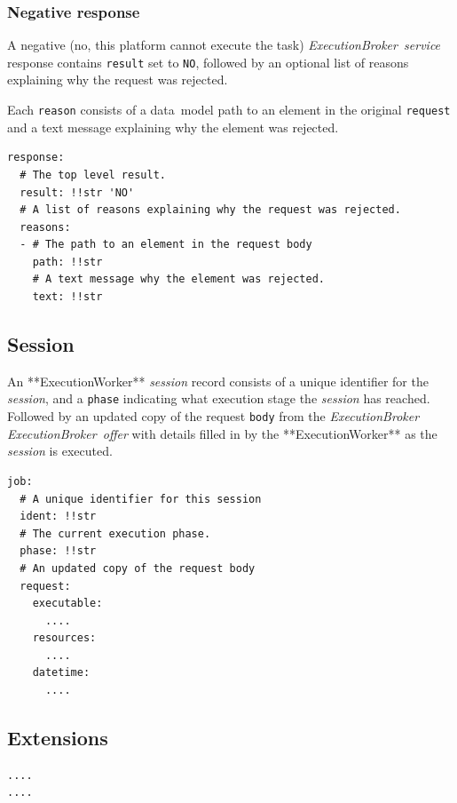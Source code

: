 \documentclass[11pt,a4paper]{ivoa}
\newcommand{\datamodel} {data~model}
\newcommand{\execworkerclass} {**ExecutionWorker**}
\newcommand{\execbrokerclass} {\textit{ExecutionBroker}}
\newcommand{\execbrokerservice}[1] {\textit{ExecutionBroker~service#1}}
\newcommand{\execoffer}[1] {\textit{ExecutionBroker~offer#1}}
\newcommand{\workerjob}[1] {\textit{session#1}}
\newcommand{\codeword}[1] {\texttt{#1}}
\begin{document}
\subsubsection{Negative response}
\label{subsub-datamodel-negative-response}

A negative (no, this platform cannot execute the task) \execbrokerservice{} response contains \codeword{result}
set to \codeword{NO}, followed by an optional list of reasons
explaining why the request was rejected.

Each \codeword{reason} consists of a \datamodel{} path to an element in the original
\codeword{request} and a text message explaining why the element was rejected.

\begin{lstlisting}[]
response:
  # The top level result.
  result: !!str 'NO'
  # A list of reasons explaining why the request was rejected.
  reasons:
  - # The path to an element in the request body
    path: !!str
    # A text message why the element was rejected.
    text: !!str
\end{lstlisting}


\subsection{Session}
\label{sub-datamodel-session}

An \execworkerclass{} \workerjob{} record consists of a unique identifier for the \workerjob{},
and a \codeword{phase} indicating what execution stage the \workerjob{} has reached.
Followed by an updated copy of the request \codeword{body} from the \execbrokerclass{}
\execoffer{} with details filled in by the \execworkerclass{} as the \workerjob{} is executed.

\begin{lstlisting}[]
job:
  # A unique identifier for this session
  ident: !!str
  # The current execution phase.
  phase: !!str
  # An updated copy of the request body
  request:
    executable:
      ....
    resources:
      ....
    datetime:
      ....
\end{lstlisting}

\subsection{Extensions}
\label{sub-datamodel-extensions}

\begin{lstlisting}[]
....
....
\end{lstlisting}
\end{document}
